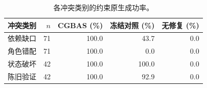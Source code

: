 \begin{table}[t]
\centering
\small
\caption{各冲突类别的约束原生成功率。}
\begin{tabular}{lrrrr}
\toprule
冲突类别 & $n$ & CGBAS (\%) & 冻结对照 (\%) & 无修复 (\%) \\
\midrule
依赖缺口 & 71 & 100.0 & 43.7 & 0.0 \\
角色错配 & 71 & 100.0 & 0.0 & 0.0 \\
状态破坏 & 42 & 100.0 & 100.0 & 0.0 \\
陈旧验证 & 42 & 100.0 & 92.9 & 0.0 \\
\bottomrule
\end{tabular}
\end{table}
